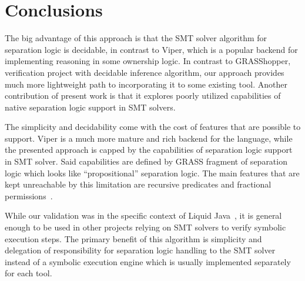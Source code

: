 \documentclass[sigplan,screen,review]{acmart}
\begin{document}


\section{Conclusions}

The big advantage of this approach is that the SMT solver algorithm for separation logic is decidable, in contrast to Viper\cite{DBLP:conf/vmcai/0001SS16}, which is a popular backend for implementing reasoning in some ownership logic. In contrast to GRASShopper\cite{piskac2014grasshopper}, verification project with decidable inference algorithm, our approach provides much more lightweight path to incorporating it to some existing tool. Another contribution of present work is that it explores poorly utilized capabilities of native separation logic support in SMT solvers. 


The simplicity and decidability come with the cost of features that are possible to support. Viper is a much more mature and rich backend for the language, while the presented approach is capped by the capabilities of separation logic support in SMT solver. Said capabilities are defined by GRASS fragment of separation logic which looks like ``propositional'' separation logic. The main features that are kept unreachable by this limitation are recursive predicates and fractional permissions~\cite{DBLP:conf/sas/Boyland03}. 

While our validation was in the specific context of Liquid Java~\cite{gamboa2021user}, it is general enough to be used in other projects relying on SMT solvers to verify symbolic execution steps. The primary benefit of this algorithm is simplicity and delegation of responsibility for separation logic handling to the SMT solver instead of a symbolic execution engine which is usually implemented separately for each tool. 




\end{document}
